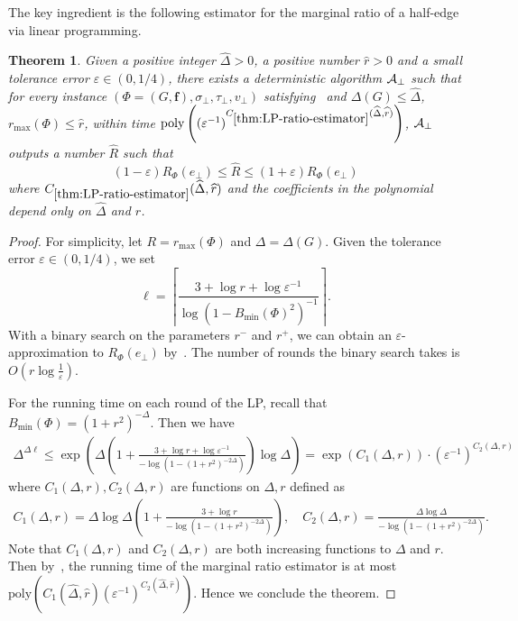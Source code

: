 \documentclass[11pt]{article}
\newtheorem{theorem}{Theorem}
\def\poly{\mathrm{poly}}
\newcommand{\wh}[1]{\widehat{#1}}
\newcommand{\vecf}{\boldsymbol{f}}
\begin{document}
The key ingredient is the following estimator for the marginal ratio of a half-edge via linear programming.

\begin{theorem} \label{thm:LP-ratio-estimator}
    Given a positive integer $\wh{\Delta} > 0$, a positive number $\wh{r} > 0$ and a small tolerance error $\varepsilon \in (0, 1/4)$, there exists a deterministic algorithm $\mathcal{A}_{\bot}$ such that for every instance $(\Phi = (G, \vecf), \sigma_\bot, \tau_\bot, v_\bot)$ satisfying~ and $\Delta(G) \le \wh{\Delta}$, $r_{\max}(\Phi) \le \wh{r}$, within time $\poly\left((\varepsilon^{-1})^{C_{\ref{thm:LP-ratio-estimator}}(\wh{\Delta}, \wh{r})}\right)$, $\mathcal{A}_{\bot}$ outputs a number $\wh{R}$ such that
    $$
        (1 - \varepsilon) R_{\Phi}(e_\bot) \le \wh{R} \le (1 + \varepsilon) R_{\Phi}(e_\bot)
    $$
    where $C_{\ref{thm:LP-ratio-estimator}}(\wh{\Delta}, \wh{r})$ and the coefficients in the polynomial depend only on $\wh{\Delta}$ and $\wh{r}$.
\end{theorem}
\begin{proof}
    For simplicity, let $R = r_{\max}(\Phi)$ and $\Delta = \Delta(G)$. Given the tolerance error $\varepsilon \in (0, 1/4)$, we set
    $$
        \ell = \left\lceil \frac{3 + \log{r} + \log{\varepsilon^{-1}}}{\log\left(1 - B_{\min}(\Phi)^2\right)^{-1}} \right\rceil.
    $$
    With a binary search on the parameters $r^-$ and $r^+$, we can obtain an $\varepsilon$-approximation to $R_\Phi(e_\bot)$ by~. The number of rounds the binary search takes is $O\left(r\log{\frac{1}{\varepsilon}}\right)$.

    For the running time on each round of the LP, recall that $B_{\min}(\Phi) = (1 + r^2)^{-\Delta}$. Then we have
    \begin{align*}
        \Delta^{\Delta \ell} \le \exp\left(\Delta\left(1 + \frac{3 + \log{r} + \log{\varepsilon^{-1}}}{-\log\left(1 - (1 + r^2)^{-2\Delta}\right)}\right) \log{\Delta}\right) = \exp(C_1(\Delta, r)) \cdot \left(\varepsilon^{-1}\right)^{C_2(\Delta, r)}
    \end{align*}
    where $C_1(\Delta, r), C_2(\Delta, r)$ are functions on $\Delta, r$ defined as
    \begin{align*}
        C_1(\Delta, r) = \Delta \log{\Delta} \left(1 + \frac{3 + \log{r}}{-\log\left(1 - (1 + r^2)^{-2\Delta}\right)}\right), \quad C_2(\Delta, r) = \frac{\Delta \log \Delta}{-\log\left(1 - (1 + r^2)^{-2\Delta}\right)}.
    \end{align*}
    Note that $C_1(\Delta, r)$ and $C_2(\Delta, r)$ are both increasing functions to $\Delta$ and $r$. Then by~, the running time of the marginal ratio estimator is at most $\poly\left(C_1(\wh{\Delta}, \wh{r}) (\varepsilon^{-1})^{C_2(\wh{\Delta}, \wh{r})}\right)$. Hence we conclude the theorem.
\end{proof}
\end{document}
